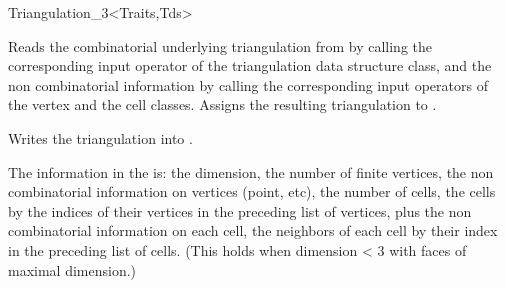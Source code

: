 \begin{ccClassTemplate}{Triangulation_3<Traits,Tds>}
\begin{ccAdvanced}
\end{ccAdvanced}


{Reads the combinatorial underlying triangulation from  by
calling the corresponding input operator of the triangulation data
structure class, and the non combinatorial information by calling the
corresponding input operators of the vertex and the cell
classes. Assigns the resulting triangulation to .}

{Writes the triangulation  into .}

The information in the  is: the dimension, the number of
finite vertices, the non combinatorial information on vertices (point,
etc), the number of cells, the cells by the indices of their vertices
in the preceding list of vertices, plus the non combinatorial
information on each cell, the neighbors of each cell by their index in
the preceding list of cells. (This holds when dimension < 3 with faces
of maximal dimension.)

\end{ccClassTemplate}

